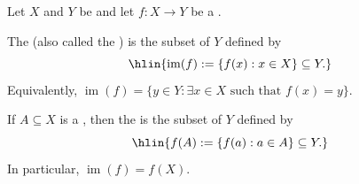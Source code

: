 \begin{definition} \label{definition:image_of_a_function_between_sets}
Let $X$ and $Y$ be  and let $f : X \to Y$ be a .

The  (also called the ) is the subset of $Y$ defined by
$$\hlin{\operatorname{im}(f) := \{ f(x) : x \in X \} \subseteq Y.}$$
Equivalently, $\operatorname{im}(f) = \{ y \in Y : \exists x \in X \text{ such that } f(x) = y \}$.

If $A \subseteq X$ is a , then the  is the subset of $Y$ defined by
$$\hlin{f(A) := \{ f(a) : a \in A \} \subseteq Y.}$$
In particular, $\operatorname{im}(f) = f(X)$.
\end{definition}